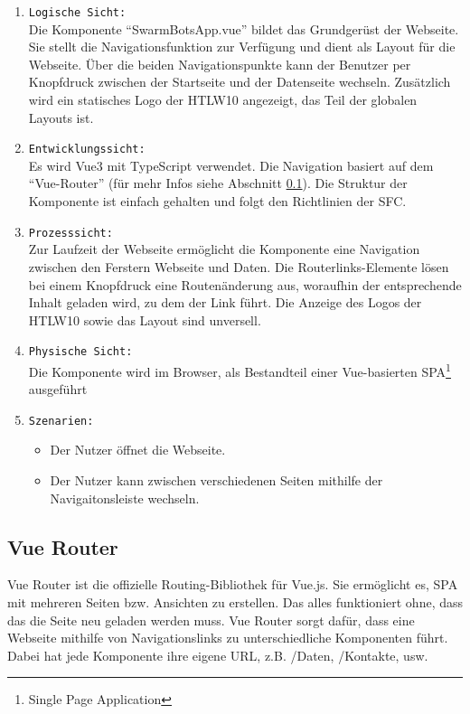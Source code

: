   \begin{enumerate}
    \item \texttt{Logische Sicht:} \\
    Die Komponente ``SwarmBotsApp.vue'' bildet das Grundgerüst der Webseite.
    Sie stellt die Navigationsfunktion zur Verfügung und dient als Layout für die Webseite.
    Über die beiden Navigationspunkte kann der Benutzer per Knopfdruck zwischen der Startseite
    und der Datenseite wechseln.
    Zusätzlich wird ein statisches Logo der HTLW10 angezeigt, das Teil der globalen Layouts ist.
    \item \texttt{Entwicklungssicht:} \\
    Es wird Vue3 mit TypeScript verwendet. 
    Die Navigation basiert auf dem ``Vue-Router'' (für mehr Infos siehe Abschnitt \ref{subsec:frontend_VueRouter}).
    Die Struktur der Komponente ist einfach gehalten und folgt den Richtlinien der SFC. 
    \item \texttt{Prozesssicht:} \\
    Zur Laufzeit der Webseite ermöglicht die Komponente eine Navigation zwischen den Ferstern Webseite und Daten.
    Die Routerlinks-Elemente lösen bei einem Knopfdruck eine Routenänderung aus, 
    woraufhin der entsprechende Inhalt geladen wird, zu dem der Link führt.
    Die Anzeige des Logos der HTLW10 sowie das Layout sind unversell. 
    \item \texttt{Physische Sicht:} \\
    Die Komponente wird im Browser, als Bestandteil einer Vue-basierten SPA\footnote{Single Page Application} ausgeführt
    \item \texttt{Szenarien:} \\
      \begin{itemize}
        \renewcommand{\labelitemi}{$\Rightarrow$}
      \item Der Nutzer öffnet die Webseite.
      \item Der Nutzer kann zwischen verschiedenen Seiten mithilfe der Navigaitonsleiste wechseln.
      \end{itemize}
  \end{enumerate}

\subsection{Vue Router}
\label{subsec:frontend_VueRouter}
Vue Router ist die offizielle Routing-Bibliothek für Vue.js. Sie ermöglicht es, 
SPA mit mehreren Seiten bzw. Ansichten zu erstellen. 
%
Das alles funktioniert ohne, dass das die Seite neu geladen werden muss. 
%
Vue Router sorgt dafür, dass eine Webseite mithilfe von Navigationslinks 
zu unterschiedliche Komponenten führt. 
Dabei hat jede Komponente ihre eigene URL, z.B. /Daten, /Kontakte, usw.

